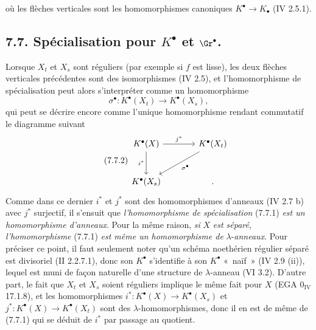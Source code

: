 
où les
flèches verticales sont les homomorphismes canoniques \(K^{\bullet}\to K_\bullet\) (IV 2.5.1).

\subsection*{7.7. Spécialisation pour \(K^\bullet\) et \(\Gr^\bullet\).}
Lorsque \(X_t\) et \(X_s\) sont réguliers (par exemple si \(f\) est lisse), les deux flèches verticales précédentes sont des isomorphismes (IV 2.5), et l'homomorphisme de spécialisation peut alors s'interpréter comme un homomorphisme
\begin{equation}\tag{7.7.1}
  \sigma^\bullet:K^\bullet(X_t)\longrightarrow K^\bullet(X_s),
\end{equation}
qui peut se décrire encore comme l'unique homomorphisme rendant commutatif le diagramme suivant
\begin{equation}\tag{7.7.2}
\begin{tikzcd}[column sep=large,row sep=large]
K^\bullet(X) \arrow[r,"j^*"] \arrow[d,"i^*"'] & K^\bullet(X_t) \arrow[dl,"\sigma^\bullet"]\\
K^\bullet(X_s) & {.}
\end{tikzcd}
\end{equation}
Comme dans ce dernier \(i^*\) et \(j^*\) sont des homomorphismes d'anneaux (IV 2.7 b) avec \(j^*\) surjectif, il s'ensuit que \emph{l'homomorphisme de spécialisation} (7.7.1) \emph{est un homomorphisme d'anneaux}. Pour la même raison, \emph{si} \(X\) \emph{est séparé}, \emph{l'homomorphisme} (7.7.1) \emph{est même un homomorphisme de} \(\lambda\)-\emph{anneaux}. Pour préciser ce point, il faut seulement noter qu'un schéma noethérien régulier séparé est divisoriel (II 2.2.7.1), donc son \(K^\bullet\) s'identifie à son \(K^\bullet\) «~naïf~» (IV 2.9 (ii)), lequel est muni de façon naturelle d'une structure de \(\lambda\)-anneau (VI 3.2). D'autre part, le fait que \(X_t\) et \(X_s\) soient réguliers implique le même fait pour \(X\) (EGA \(0_{\mathrm{IV}}\) 17.1.8), et les homomorphismes \(i^*:K^\bullet(X)\to K^\bullet(X_s)\) et \(j^*:K^\bullet(X)\to K^\bullet(X_t)\) sont des \(\lambda\)-homomorphismes, donc il en est de même de (7.7.1) qui se déduit de \(i^*\) par passage au quotient.

